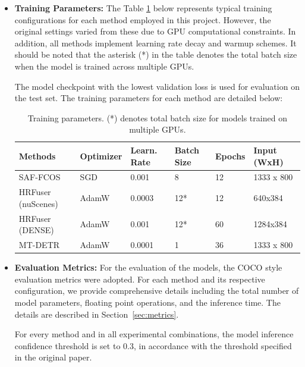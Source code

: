 \documentclass[report.tex]{subfiles}
\begin{document}
        \begin{itemize}
            
            \item \textbf{Training Parameters:} The Table \ref{tab:experiment_training_parameters} below represents typical training configurations for each method employed in this project. However, the original settings varied from these due to GPU computational constraints. In addition, all methods implement learning rate decay and warmup schemes. It should be noted that the asterisk (*) in the table denotes the total batch size when the model is trained across multiple GPUs.
            
            The model checkpoint with the lowest validation loss is used for evaluation on the test set. The training parameters for each method are detailed below:

            \begin{table}[h]
                \centering
                \caption{Training parameters. (*) denotes total batch size for models trained on multiple GPUs.}
                \begin{tabular}{|l|l|l|l|l|l|}
                \hline
                \textbf{Methods} & \textbf{Optimizer} & \textbf{Learn. Rate} & \textbf{Batch Size} & \textbf{Epochs} & \textbf{Input (WxH)} \\ \hline
                SAF-FCOS         & SGD                & 0.001                & 8                   & 12              & 1333 x 800           \\ \hline
                HRFuser (nuScenes) & AdamW             & 0.0003               & 12*                 & 12              & 640x384              \\ \hline
                HRFuser (DENSE)    & AdamW             & 0.001                & 12*                 & 60              & 1284x384             \\ \hline
                MT-DETR            & AdamW             & 0.0001               & 1                   & 36              & 1333 x 800           \\ \hline
                \end{tabular}
                \label{tab:experiment_training_parameters}
            \end{table}
            
            
            \item \textbf{Evaluation Metrics:} For the evaluation of the models, the COCO style evaluation metrics were adopted. For each method and its respective configuration, we provide comprehensive details including the total number of model parameters, floating point operations, and the inference time. The details are described in Section~\ref{sec:metrics}.
            
            For every method and in all experimental combinations, the model inference confidence threshold is set to 0.3, in accordance with the threshold specified in the original paper.
        \end{itemize}
\end{document}
